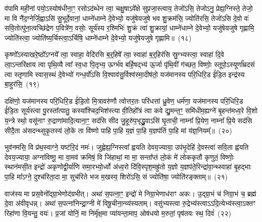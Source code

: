 व॑पामि मही॒नां पयो॒\-ऽस्योष॑धीना॒ꣳ॒ रसो\-ऽद॑ब्धेन त्वा॒ चक्षु॒षा\-ऽवे᳚क्षे सुप्रजा॒स्त्वाय॒ तेजो॑\-ऽसि॒ तेजो\-ऽनु॒ प्रेह्य॒ग्निस्ते॒ तेजो॒ मा वि नै॑द॒ग्नेर्जि॒ह्वा\-ऽसि॑ सु॒भूर्दे॒वानां॒ धाम्ने॑धाम्ने दे॒वेभ्यो॒ यजु॑षेयजुषे भव शु॒क्रम॑सि॒ ज्योति॑रसि॒ तेजो॑\-ऽसि दे॒वो वः॑ सवि॒तोत्पु॑ना॒त्वच्छि॑द्रेण प॒वित्रे॑ण॒ वसोः॒ सूर्य॑स्य र॒श्मिभिः॑ शु॒क्रं त्वा॑ शु॒क्रायां॒ धाम्ने॑धाम्ने दे॒वेभ्यो॒ यजु॑षेयजुषे गृह्णामि॒ ज्योति॑स्त्वा॒ ज्योति॑ष्य॒र्चिस्त्वा॒\-ऽर्चिषि॒ धाम्ने॑धाम्ने दे॒वेभ्यो॒ यजु॑षेयजुषे गृह्णामि॥~(१८)\ip

{\anuvakamend[{उप॒ नी र॒श्मिभिः॑ शु॒क्रꣳ षोड॑श च}]}

कृष्णो᳚\-ऽस्याखरे॒ष्ठो᳚\-ऽग्नये᳚ त्वा॒ स्वाहा॒ वेदि॑रसि ब॒र्॒हिषे᳚ त्वा॒ स्वाहा॑ ब॒र्॒हिर॑सि स्रु॒ग्भ्यस्त्वा॒ स्वाहा॑ दि॒वे त्वा॒\-ऽन्तरि॑क्षाय त्वा पृथि॒व्यै त्वा᳚ स्व॒धा पि॒तृभ्य॒ ऊर्ग्भ॑व बर्\mbox{}हि॒षद्भ्य॑ ऊ॒र्जा पृ॑थि॒वीं ग॑च्छत॒ विष्णोः॒ स्तूपो॒\-ऽस्यूर्णा᳚म्रदसं त्वा स्तृणामि स्वास॒स्थं दे॒वेभ्यो॑ गन्ध॒र्वो॑\-ऽसि वि॒श्वाव॑सु॒र्विश्व॑स्मा॒दीष॑तो॒ यज॑मानस्य परि॒धिरि॒ड ई॑डि॒त इन्द्र॑स्य बा॒हुर॑सि॒~(१९)\ip

दक्षि॑णो॒ यज॑मानस्य परि॒धिरि॒ड ई॑डि॒तो मि॒त्रावरु॑णौ त्वोत्तर॒तः परि॑धत्तां ध्रु॒वेण॒ धर्म॑णा॒ यज॑मानस्य परि॒धिरि॒ड ई॑डि॒तः सूर्य॑स्त्वा पु॒रस्ता᳚त्पातु॒ कस्या᳚श्चिद॒भिश॑स्त्या वी॒तिहो᳚त्रं त्वा कवे द्यु॒मन्त॒ꣳ॒ समि॑धीम॒ह्यग्ने॑ बृ॒हन्त॑मध्व॒रे वि॒शो य॒न्त्रे स्थो॒ वसू॑नाꣳ रु॒द्राणा॑मादि॒त्याना॒ꣳ॒ सद॑सि सीद जु॒हूरु॑प॒भृद्ध्रु॒वा\-ऽसि॑ घृ॒ताची॒ नाम्ना᳚ प्रि॒येण॒ नाम्ना᳚ प्रि॒ये सद॑सि सीदै॒ता अ॑सदन्थ्सुकृ॒तस्य॑ लो॒के ता वि॑ष्णो पाहि पा॒हि य॒ज्ञं पा॒हि य॒ज्ञप॑तिं पा॒हि मां य॑ज्ञ॒नियम्᳚॥~(२०)\ip

{\anuvakamend[{बा॒हुर॑सि प्रि॒ये सद॑सि पञ्च॑दश च}]}

भुव॑नमसि॒ वि प्र॑थ॒स्वाग्ने॒ यष्ट॑रि॒दं नमः॑। जुह्वेह्य॒ग्निस्त्वा᳚ ह्वयति देवय॒ज्याया॒ उप॑भृ॒देहि॑ दे॒वस्त्वा॑ सवि॒ता ह्व॑यति देवय॒ज्याया॒ अग्ना॑विष्णू॒ मा वा॒मव॑ क्रमिषं॒ वि जि॑हाथां॒ मा मा॒ सन्ता᳚प्तं लो॒कं मे॑ लोककृतौ कृणुतं॒ विष्णोः॒ स्थान॑मसी॒त इन्द्रो॑ अकृणोद्वी॒र्या॑णि समा॒रभ्यो॒र्ध्वो अ॑ध्व॒रो दि॑वि॒स्पृश॒मह्रु॑तो य॒ज्ञो य॒ज्ञप॑ते॒\-रिन्द्रा॑\-वा॒न्थ्स्वाहा॑ बृ॒हद्भाः पा॒हि मा᳚\-ऽग्ने॒ दुश्च॑रिता॒दा मा॒ सुच॑रिते भज म॒खस्य॒ शिरो॑\-ऽसि॒ सं ज्योति॑षा॒ ज्योति॑रङ्क्ताम्॥~(२१)\ip

{\anuvakamend[{अह्रु॑त॒ एक॑विꣳशतिश्च}]}

वाज॑स्य मा प्रस॒वेनो᳚द्ग्रा॒भेणोद॑ग्रभीत्। अथा॑ स॒पत्ना॒ꣳ॒ इन्द्रो॑ मे निग्रा॒भेणाध॑राꣳ अकः। उ॒द्ग्रा॒भं च॑ निग्रा॒भं च॒ ब्रह्म॑ दे॒वा अ॑वीवृधन्न्। अथा॑ स॒पत्ना॑निन्द्रा॒ग्नी मे॑ विषू॒चीना॒न्व्य॑स्यताम्। वसु॑भ्यस्त्वा रु॒द्रेभ्य॑स्त्वा\-ऽऽ\-दि॒त्येभ्य॑स्त्वा॒\-ऽक्तꣳ रिहा॑णा वि॒यन्तु॒ वयः॑। प्र॒जां योनिं॒ मा निर्मृ॑क्ष॒मा प्या॑यन्ता॒माप॒ ओष॑धयो म॒रुतां॒ पृष॑तयः स्थ॒ दिवं॑~(२२)\ip


